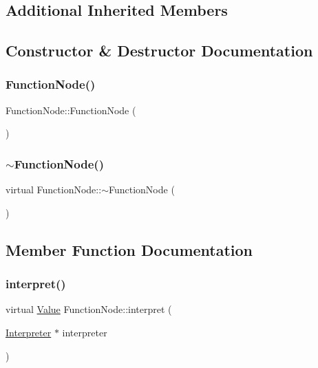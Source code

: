 \subsection*{Additional Inherited Members}


\subsection{Constructor \& Destructor Documentation}
\mbox{\label{classFunctionNode_ac4467a4c13382e0058cb2bd4fb70e0ab}} 
\subsubsection{\texorpdfstring{Function\+Node()}{FunctionNode()}}
{\footnotesize\ttfamily Function\+Node\+::\+Function\+Node (\begin{DoxyParamCaption}{ }\end{DoxyParamCaption})}

\mbox{\label{classFunctionNode_ad9c4a35db175de9386ac86d91a1a95df}} 
\subsubsection{\texorpdfstring{$\sim$\+Function\+Node()}{~FunctionNode()}}
{\footnotesize\ttfamily virtual Function\+Node\+::$\sim$\+Function\+Node (\begin{DoxyParamCaption}{ }\end{DoxyParamCaption})\hspace{0.3cm}{\ttfamily [virtual]}}



\subsection{Member Function Documentation}
\mbox{\label{classFunctionNode_a059e6682cd51d0e126372a7af257ea5a}} 
\subsubsection{\texorpdfstring{interpret()}{interpret()}}
{\footnotesize\ttfamily virtual \hyperlink{classValue}{Value} Function\+Node\+::interpret (\begin{DoxyParamCaption}\item[{\hyperlink{classInterpreter}{Interpreter} $\ast$}]{interpreter }\end{DoxyParamCaption})\hspace{0.3cm}{\ttfamily [virtual]}}



